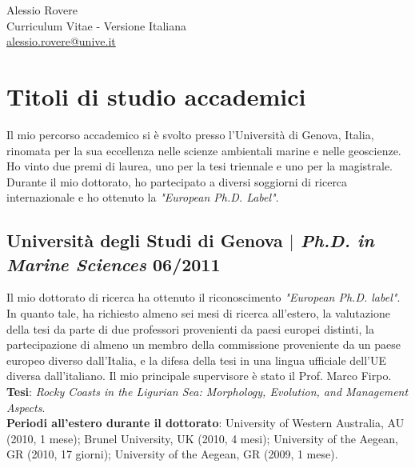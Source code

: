 \documentclass[11pt]{article}
\begin{document}
\begin{center}
    {\fontsize{36}{36}\selectfont\interthin Alessio \interheavy Rovere} \\ \bigskip
    {\fontsize{14}{14}\selectfont\interthin Curriculum Vitae - Versione Italiana}\\ \bigskip
    {\color{icnclr}\faEnvelope[regular]} \href{mailto:alessio.rovere@unive.it}{alessio.rovere@unive.it}
\end{center}

\section{Titoli di studio accademici}
{\normalfont Il mio percorso accademico si è svolto presso l'Università di Genova, Italia, rinomata per la sua eccellenza nelle scienze ambientali marine e nelle geoscienze. Ho vinto due premi di laurea, uno per la tesi triennale e uno per la magistrale. Durante il mio dottorato, ho partecipato a diversi soggiorni di ricerca internazionale e ho ottenuto la \textit{"European Ph.D. Label"}.} \\

\bigskip
\subsection{Università degli Studi di Genova $|$ {\normalfont\textit{Ph.D. in Marine Sciences}} \hfill 06/2011}
{\footnotesize Il mio dottorato di ricerca ha ottenuto il riconoscimento \textit{"European Ph.D. label"}. In quanto tale, ha richiesto almeno sei mesi di ricerca all'estero, la valutazione della tesi da parte di due professori provenienti da paesi europei distinti, la partecipazione di almeno un membro della commissione proveniente da un paese europeo diverso dall'Italia, e la difesa della tesi in una lingua ufficiale dell'UE diversa dall'italiano. Il mio principale supervisore è stato il Prof. Marco Firpo. \\
\textbf{Tesi}: \textit{Rocky Coasts in the Ligurian Sea: Morphology, Evolution, and Management Aspects}.\\ 
\textbf{Periodi all'estero durante il dottorato}: University of Western Australia, AU (2010, 1 mese); Brunel University, UK (2010, 4 mesi); University of the Aegean, GR (2010, 17 giorni); University of the Aegean, GR (2009, 1 mese).}
\bigskip
\end{document}
